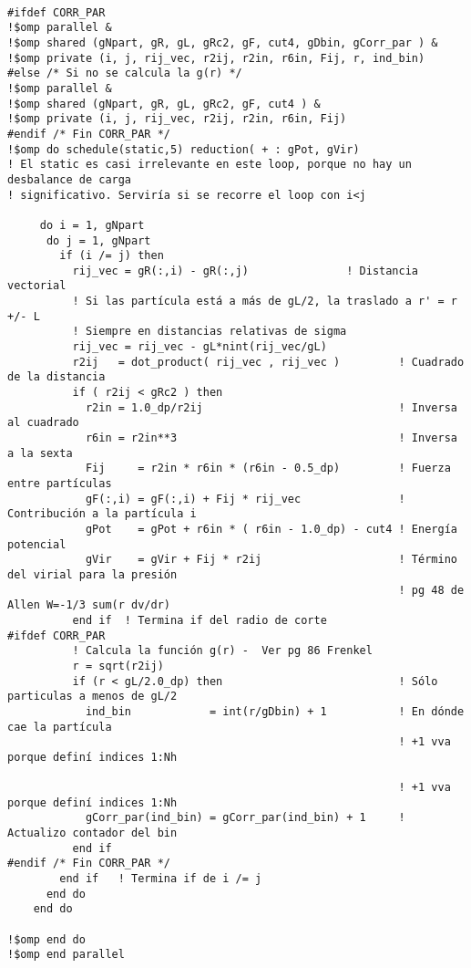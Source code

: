\begin{verbatim}

#ifdef CORR_PAR
!$omp parallel &
!$omp shared (gNpart, gR, gL, gRc2, gF, cut4, gDbin, gCorr_par ) &
!$omp private (i, j, rij_vec, r2ij, r2in, r6in, Fij, r, ind_bin)
#else /* Si no se calcula la g(r) */
!$omp parallel &
!$omp shared (gNpart, gR, gL, gRc2, gF, cut4 ) &
!$omp private (i, j, rij_vec, r2ij, r2in, r6in, Fij)
#endif /* Fin CORR_PAR */
!$omp do schedule(static,5) reduction( + : gPot, gVir)
! El static es casi irrelevante en este loop, porque no hay un desbalance de carga
! significativo. Serviría si se recorre el loop con i<j

     do i = 1, gNpart
      do j = 1, gNpart
        if (i /= j) then
          rij_vec = gR(:,i) - gR(:,j)               ! Distancia vectorial
          ! Si las partícula está a más de gL/2, la traslado a r' = r +/- L
          ! Siempre en distancias relativas de sigma
          rij_vec = rij_vec - gL*nint(rij_vec/gL)
          r2ij   = dot_product( rij_vec , rij_vec )         ! Cuadrado de la distancia
          if ( r2ij < gRc2 ) then
            r2in = 1.0_dp/r2ij                              ! Inversa al cuadrado
            r6in = r2in**3                                  ! Inversa a la sexta
            Fij     = r2in * r6in * (r6in - 0.5_dp)         ! Fuerza entre partículas
            gF(:,i) = gF(:,i) + Fij * rij_vec               ! Contribución a la partícula i
            gPot    = gPot + r6in * ( r6in - 1.0_dp) - cut4 ! Energía potencial
            gVir    = gVir + Fij * r2ij                     ! Término del virial para la presión
                                                            ! pg 48 de Allen W=-1/3 sum(r dv/dr)
          end if  ! Termina if del radio de corte
#ifdef CORR_PAR
          ! Calcula la función g(r) -  Ver pg 86 Frenkel
          r = sqrt(r2ij)
          if (r < gL/2.0_dp) then                           ! Sólo particulas a menos de gL/2
            ind_bin            = int(r/gDbin) + 1           ! En dónde cae la partícula
                                                            ! +1 vva porque definí indices 1:Nh

                                                            ! +1 vva porque definí indices 1:Nh
            gCorr_par(ind_bin) = gCorr_par(ind_bin) + 1     ! Actualizo contador del bin
          end if
#endif /* Fin CORR_PAR */
        end if   ! Termina if de i /= j
      end do
    end do

!$omp end do
!$omp end parallel

\end{verbatim}

